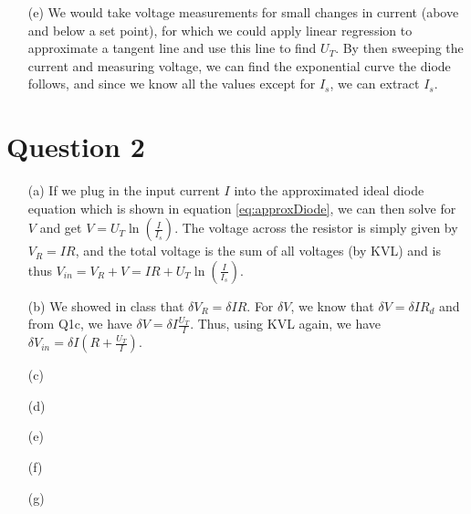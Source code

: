 \documentclass{article}
\begin{document}
\begin{itemize}
    \item [(e)]
        We would take voltage measurements for small changes in current (above and below a set point), for which we could apply linear regression to approximate a tangent line and use this line to find $U_T$. By then sweeping the current and measuring voltage, we can find the exponential curve the diode follows, and since we know all the values except for $I_s$, we can extract $I_s$. 
\end{itemize}

\section{Question 2}

\begin{itemize}
    \item [(a)]
        If we plug in the input current $I$ into the approximated ideal diode equation which is shown in equation \ref{eq:approxDiode}, we can then solve for $V$ and get $V = U_T\ln{(\frac{I}{I_s})}$. The voltage across the resistor is simply given by $V_R = IR$, and the total voltage is the sum of all voltages (by KVL) and is thus $V_{in} = V_R + V = IR +U_T\ln{(\frac{I}{I_s})}$.

    \item [(b)]
        We showed in class that $\delta V_R = \delta IR$. For $\delta V$, we know that $\delta V = \delta I R_d$ and from Q1c, we have $\delta V = \delta I \frac{U_T}{I}$. Thus, using KVL again, we have $\delta V_{in} = \delta I (R + \frac{U_T}{I})$.

    \item [(c)]


    \item [(d)]
    \item [(e)]
    \item [(f)]
    \item [(g)]
\end{itemize}
\end{document}
